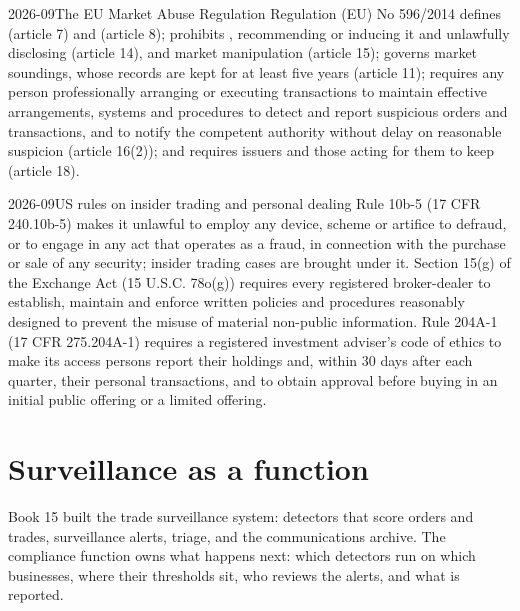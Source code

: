 \begin{dated}{2026-09}{The EU Market Abuse Regulation}\label{dat:fm:compliance-and-market-abuse:mar}
Regulation (EU) No 596/2014 defines  (article 7) and  (article 8); prohibits , recommending or
inducing it and unlawfully disclosing  (article 14), and market manipulation (article 15); governs market soundings, whose
records are kept for at least five years (article 11); requires any person professionally arranging or executing transactions to maintain
effective arrangements, systems and procedures to detect and report suspicious orders and transactions, and to notify the competent authority
without delay on reasonable suspicion (article 16(2)); and requires issuers and those acting for them to keep  (article 18).
\end{dated}

\begin{dated}{2026-09}{US rules on insider trading and personal dealing}\label{dat:fm:compliance-and-market-abuse:us}
Rule 10b-5 (17 CFR 240.10b-5) makes it unlawful to employ any device, scheme or artifice to defraud, or to engage in any act that operates as a
fraud, in connection with the purchase or sale of any security; insider trading cases are brought under it. Section 15(g) of the Exchange Act (15
U.S.C. 78o(g)) requires every registered broker-dealer to establish, maintain and enforce written policies and procedures reasonably designed to
prevent the misuse of material non-public information. Rule 204A-1 (17 CFR 275.204A-1) requires a registered investment adviser's code of ethics
to make its access persons report their holdings and, within 30 days after each quarter, their personal transactions, and to obtain approval
before buying in an initial public offering or a limited offering.
\end{dated}

\section{Surveillance as a function}

Book 15 built the trade surveillance system: detectors that score orders and trades, surveillance alerts, triage, and the communications archive.
The compliance function owns what happens next: which detectors run on which businesses, where their thresholds sit, who reviews the alerts, and
what is reported.

